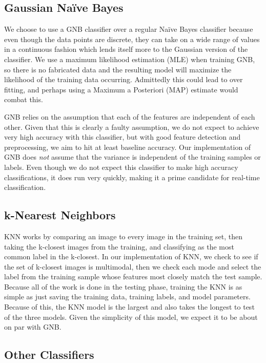 \documentclass{article} %
\begin{document}
\subsection*{Gaussian Na\"ive Bayes}

We choose to use a GNB classifier over a regular Na\"ive Bayes classifier because even though the data points are discrete, they can take on a wide range of values in a continuous fashion which lends itself more to the Gaussian version of the classifier. We use a maximum likelihood estimation (MLE) when training GNB, so there is no fabricated data and the resulting model will maximize the likelihood of the training data occurring. Admittedly this could lead to over fitting, and perhaps using a Maximum a Posteriori (MAP) estimate would combat this.

GNB relies on the assumption that each of the features are independent of each other. Given that this is clearly a faulty assumption, we do not expect to achieve very high accuracy with this classifier, but with good feature detection and preprocessing, we aim to hit at least baseline accuracy. Our implementation of GNB does \textit{not} assume that the variance is independent of the training samples or labels. Even though we do not expect this classifier to make high accuracy classifications, it does run very quickly, making it a prime candidate for real-time classification.

\subsection*{k-Nearest Neighbors}

KNN works by comparing an image to every image in the training set, then taking the k-closest images from the training, and classifying as the most common label in the k-closest. In our implementation of KNN, we check to see if the set of k-closest images is multimodal, then we check each mode and select the label from the training sample whose features most closely match the test sample. Because all of the work is done in the testing phase, training the KNN is as simple as just saving the training data, training labels, and model parameters. Because of this, the KNN model is the largest and also takes the longest to test of the three models. Given the simplicity of this model, we expect it to be about on par with GNB.

\subsection*{Other Classifiers}
\end{document}
